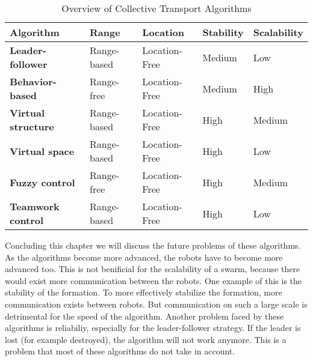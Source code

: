   \begin{table}[H]
  \renewcommand{\arraystretch}{1.3}
  \label{table_alg_formation}
  \caption{Overview of Collective Transport Algorithms}
  \centering
  \begin{tabular}{|p{5cm}|l|l|l|l|}
    \hline
    \bfseries Algorithm & \bfseries Range & Location & \bfseries Stability & \bfseries Scalability\\
    \hline
    \bfseries Leader-follower & Range-based & Location-Free & Medium & Low\\\hline
    \bfseries Behavior-based & Range-free & Location-Free & Medium & High\\\hline
    \bfseries Virtual structure& Range-based& Location-Free & High  & Medium\\\hline
    \bfseries Virtual space & Range-based& Location-Free & High  & Low\\\hline
    \bfseries Fuzzy control& Range-free& Location-Free & High  & Medium\\\hline
    \bfseries Teamwork control& Range-based& Location-Free & High  & Low\\\hline

    \end{tabular}
  \end{table}

Concluding this chapter we will discuss the future problems of these algorithms. 
As the algorithms become more advanced, the robots have to become more advanced too.
This is not benificial for the scalability of a swarm, because there would exist more communication between the robots. 
One example of this is the stability of the formation. 
To more effectively stabilize the formation, more communication exists between robots. 
But communication on such a large scale is detrimental for the speed of the algorithm. 
Another problem faced by these algorithms is reliabiliy, especially for the leader-follower strategy. 
If the leader is lost (for example destroyed), the algorithm will not work anymore. 
This is a problem that most of these algorithms do not take in account.  
